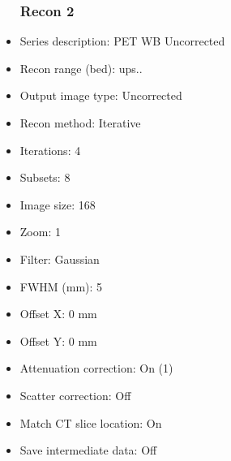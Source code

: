 \documentclass[12pt]{article}
\begin{document}
\begin{itemize}
\subsubsection{Recon 2}
\item Series description: PET WB Uncorrected
\item Recon range (bed): ups..
\item Output image type: Uncorrected
\item Recon method: Iterative
\item Iterations: 4
\item Subsets: 8
\item Image size: 168
\item Zoom: 1
\item Filter: Gaussian
\item FWHM (mm): 5
\item Offset X: 0 mm
\item Offset Y: 0 mm
\item Attenuation correction: On (1)
\item Scatter correction: Off
\item Match CT slice location: On
\item Save intermediate data: Off
\end{itemize}
\end{document}
